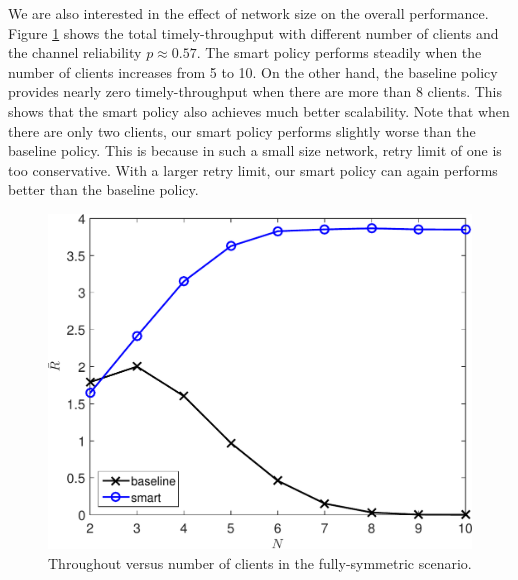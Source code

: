 \documentclass{article}
\begin{document}
We are also interested in the effect of network size on the overall performance. Figure \ref{sim: sym: different N} shows the total timely-throughput with different number of clients and the channel reliability $p \approx 0.57$. The smart policy performs steadily when the number of clients increases from 5 to 10. On the other hand, the baseline policy provides nearly zero timely-throughput when there are more than 8 clients. This shows that the smart policy also achieves much better scalability. Note that when there are only two clients, our smart policy performs slightly worse than the baseline policy. This is because in such a small size network, retry limit of one is too conservative. With a larger retry limit, our smart policy can again performs better than the baseline policy.

\begin{figure}[htbp]
\centering
\includegraphics[scale=0.5]{R_N_sym.pdf}
\caption{Throughout versus number of clients in the fully-symmetric scenario.}
\label{sim: sym: different N}
\end{figure}


\end{document}
